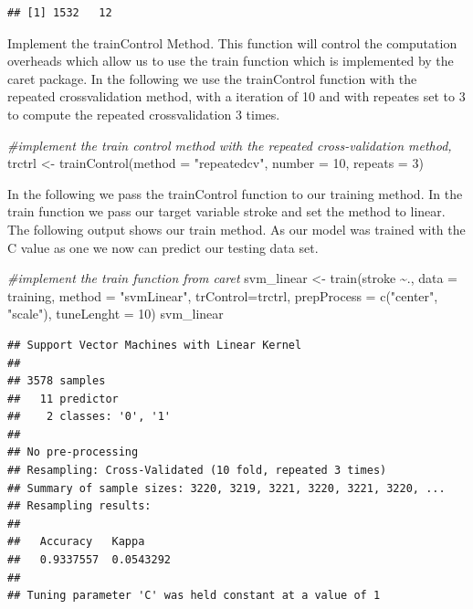 \documentclass[
]{article}
\newenvironment{Shaded}{\begin{snugshade}}{\end{snugshade}}
\newcommand{\AttributeTok}[1]{\textcolor[rgb]{0.77,0.63,0.00}{#1}}
\newcommand{\CommentTok}[1]{\textcolor[rgb]{0.56,0.35,0.01}{\textit{#1}}}
\newcommand{\DecValTok}[1]{\textcolor[rgb]{0.00,0.00,0.81}{#1}}
\newcommand{\FunctionTok}[1]{\textcolor[rgb]{0.00,0.00,0.00}{#1}}
\newcommand{\NormalTok}[1]{#1}
\newcommand{\OtherTok}[1]{\textcolor[rgb]{0.56,0.35,0.01}{#1}}
\newcommand{\SpecialCharTok}[1]{\textcolor[rgb]{0.00,0.00,0.00}{#1}}
\newcommand{\StringTok}[1]{\textcolor[rgb]{0.31,0.60,0.02}{#1}}
\renewcommand{\=}[1]{\stackrel{#1}{=}}
\theoremstyle{definition}
\theoremstyle{remark}
\begin{document}
\begin{verbatim}
## [1] 1532   12
\end{verbatim}

Implement the trainControl Method. This function will control the computation overheads which allow us to use the train function which is implemented by the caret package. In the following we use the trainControl function with the repeated crossvalidation method, with a iteration of 10 and with repeates set to 3 to compute the repeated crossvalidation 3 times.

\begin{Shaded}
\begin{Highlighting}[]
\CommentTok{\#implement the train control method with the repeated cross{-}validation method, }
\NormalTok{trctrl }\OtherTok{\textless{}{-}} \FunctionTok{trainControl}\NormalTok{(}\AttributeTok{method =} \StringTok{"repeatedcv"}\NormalTok{, }\AttributeTok{number =} \DecValTok{10}\NormalTok{, }\AttributeTok{repeats =} \DecValTok{3}\NormalTok{)}
\end{Highlighting}
\end{Shaded}

In the following we pass the trainControl function to our training method. In the train function we pass our target variable stroke and set the method to linear. The following output shows our train method. As our model was trained with the C value as one we now can predict our testing data set.

\begin{Shaded}
\begin{Highlighting}[]
\CommentTok{\#implement the train function from caret}
\NormalTok{svm\_linear }\OtherTok{\textless{}{-}} \FunctionTok{train}\NormalTok{(stroke }\SpecialCharTok{\textasciitilde{}}\NormalTok{., }\AttributeTok{data =}\NormalTok{ training, }\AttributeTok{method =} \StringTok{"svmLinear"}\NormalTok{,}
                    \AttributeTok{trControl=}\NormalTok{trctrl,}
                    \AttributeTok{prepProcess =} \FunctionTok{c}\NormalTok{(}\StringTok{"center"}\NormalTok{, }\StringTok{"scale"}\NormalTok{),}
                    \AttributeTok{tuneLenght =} \DecValTok{10}\NormalTok{)}
\NormalTok{svm\_linear}
\end{Highlighting}
\end{Shaded}

\begin{verbatim}
## Support Vector Machines with Linear Kernel 
## 
## 3578 samples
##   11 predictor
##    2 classes: '0', '1' 
## 
## No pre-processing
## Resampling: Cross-Validated (10 fold, repeated 3 times) 
## Summary of sample sizes: 3220, 3219, 3221, 3220, 3221, 3220, ... 
## Resampling results:
## 
##   Accuracy   Kappa    
##   0.9337557  0.0543292
## 
## Tuning parameter 'C' was held constant at a value of 1
\end{verbatim}
\end{document}

